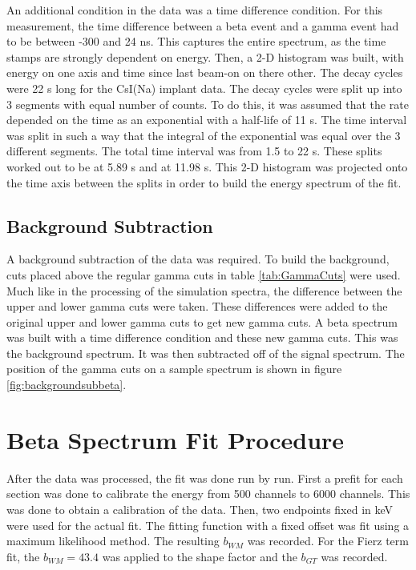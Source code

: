 \documentclass[../MaxHughesThesis.tex]{subfiles}
\begin{document}
An additional condition in the data was a time difference condition.
For this measurement, the time difference between a beta event and a gamma event had to be between -300 and 24 ns.
This captures the entire spectrum, as the time stamps are strongly dependent on energy. 
Then, a 2-D histogram was built, with energy on one axis and time since last beam-on on there other.
The decay cycles were 22 s long for the CsI(Na) implant data. 
The decay cycles were split up into 3 segments with equal number of counts.
To do this, it was assumed that the rate depended on the time as an exponential with a half-life of 11 s.
The time interval was split in such a way that the integral of the exponential was equal over the 3 different segments.
The total time interval was from 1.5 to 22 s.
These splits worked out to be at 5.89 s and at 11.98 s. 
This 2-D histogram was projected onto the time axis between the splits in order to build the energy spectrum of the fit. 

\subsection{Background Subtraction}

A background subtraction of the data was required.
To build the background, cuts placed above the regular gamma cuts in table \ref{tab:GammaCuts} were used.
Much like in the processing of the simulation spectra, the difference between the upper and lower gamma cuts were taken.
These differences were added to the original upper and lower gamma cuts to get new gamma cuts.
A beta spectrum was built with a time difference condition and these new gamma cuts.
This was the background spectrum.
It was then subtracted off of the signal spectrum. 
The position of the gamma cuts on a sample spectrum is shown in figure \ref{fig:backgroundsubbeta}.


\section{Beta Spectrum Fit Procedure}
After the data was processed, the fit was done run by run.
First a prefit for each section was done to calibrate the energy from 500 channels to 6000 channels.
This was done to obtain a calibration of the data.
Then, two endpoints fixed in keV were used for the actual fit.
The fitting function with a fixed offset was fit using a maximum likelihood method.
The resulting $b_{WM}$ was recorded.
For the Fierz term fit, the $b_{WM} = 43.4$ was applied to the shape factor and the $b_{GT}$ was recorded.
\end{document}
